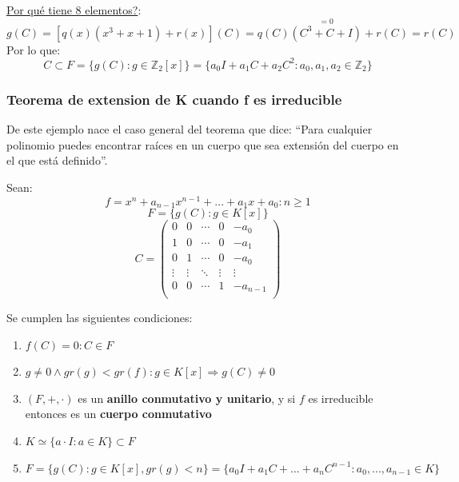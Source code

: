 \documentclass[10pt,a4paper,openright]{book}
\begin{document}
\underline{Por qué tiene 8 elementos?}:
$$g(C)=[q(x)(x^3+x+1)+r(x)](C)=q(C)\stackrel{=0}{(C^3+C+I)}+r(C)=r(C)$$
Por lo que:
$$C\subset F=\{g(C): g\in \mathbb Z_2[x]\}=\{a_0I+a_1C+a_2C^2: a_0,a_1,a_2\in \mathbb Z_2\}$$

\subsubsection*{Teorema de extension de K cuando f es irreducible}
De este ejemplo nace el caso general del teorema que dice: ``Para cualquier polinomio puedes encontrar raíces en un cuerpo que sea extensión del cuerpo en el que está definido''.\par
Sean:
$$f=x^n+a_{n-1}x^{n-1}+...+a_1x+a_0: n\geq 1$$
$$F=\{g(C): g\in K[x]\}$$
$$C=\left(\begin{array}{ccccc}
0 & 0 & \cdots & 0 & -a_0 \\
1 & 0 & \cdots & 0 & -a_1 \\
0 & 1 & \cdots & 0 & -a_0 \\
\vdots & \vdots & \ddots & \vdots & \vdots \\
0 & 0 & \cdots & 1 & -a_{n-1}\\
\end{array}\right)$$

Se cumplen las siguientes condiciones:
\begin{enumerate}
\item $f(C)=0: C\in F$
\item $g\neq 0 \wedge gr(g)<gr(f): g\in K[x]\Rightarrow g(C)\neq 0$
\item $(F,+,\cdot)$ es un \textbf{anillo conmutativo y unitario}, y si $f$ es irreducible entonces es un \textbf{cuerpo conmutativo}
\item $K\simeq \{a\cdot I: a\in K\}\subset F$
\item $F=\{g(C): g\in K[x], gr(g)<n\}=\{a_0I+a_1C+...+a_nC^{n-1}: a_0,...,a_{n-1}\in K\}$
\end{enumerate}
\end{document}
